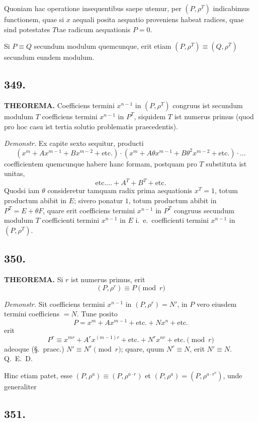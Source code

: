 \documentclass[12pt,a4paper]{article}
\newcommand{\Sec}{\S}
\begin{document}
Quoniam hac operatione insequentibus saepe utemur, per $(P,\rho^T)$ indicabimus functionem, quae si $x$ aequali posita aequatio proveniens habeat radices, quae sind potestates $T$tae radicum aequationis $P=0$.

Si $P\equiv Q$ secundum modulum quemcunque, erit etiam $(P,\rho^T)\equiv (Q,\rho^T)$ secundum eundem modulum.

\subsection*{349.}

\textbf{THEOREMA.} Coefficiens termini $x^{n-1}$ in $(P,\rho^T)$ congruus ist secundum modulum $T$ coefficiens termini $x^{n-1}$ in $P^T$, siquidem $T$ ist numerus primus (quod pro hoc casu ist tertia solutio problematis praecedentis).

\textit{Demonstr.} Ex capite sexto sequitur, producti
\[
(x^m+Ax^{m-1}+Bx^{m-2}+\text{etc.})\cdot(x^m+A\theta x^{m-1}+B\theta^2 x^{m-2}+\text{etc.})\cdot\ldots
\]
coefficientem quemcunque habere hanc formam, postquam pro $T$ substituta ist unitas,
\[
\text{etc.}\ldots + A^T + B^T + \text{etc.}
\]
Quodsi iam $\theta$ consideretur tamquam radix prima aequationis $x^T=1$, totum productum abibit in $E$; sivero ponatur $1$, totum productum abibit in $P^T=E+\theta F$, quare erit coefficiens termini $x^{n-1}$ in $P^T$ congruus secundum modulum $T$ coefficienti termini $x^{n-1}$ in $E$ i.~e.~coefficienti termini $x^{n-1}$ in $(P,\rho^T)$.

\subsection*{350.}

\textbf{THEOREMA.} Si $r$ ist numerus primus, erit
\[
(P,\rho^r) \equiv P \pmod{r}
\]

\textit{Demonstr.} Sit coefficiens termini $x^{n-1}$ in $(P,\rho^r)=N'$, in $P$ vero eiusdem termini coefficiens $=N$. Tune posito
\[
P = x^m + Ax^{m-1} + \text{etc.} + Nx^n + \text{etc.}
\]
erit
\[
P^r \equiv x^{mr} + A^r x^{(m-1)r} + \text{etc.} + N^r x^{nr} + \text{etc.} \pmod{r}
\]
adeoque (\Sec.~praec.) $N'\equiv N^r\pmod{r}$; quare, quum $N^r\equiv N$, erit $N'\equiv N$. Q.~E.~D.

Hinc etiam patet, esse $(P,\rho^a)\equiv (P,\rho^{a\cdot r})$ et $(P,\rho^a)=(P,\rho^{a\cdot r^\nu})$, unde generaliter

\subsection*{351.}
\end{document}
